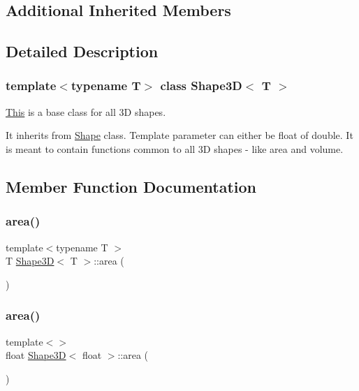\subsection*{Additional Inherited Members}


\subsection{Detailed Description}
\subsubsection*{template$<$typename T$>$\newline
class Shape3\+D$<$ T $>$}

\mbox{\hyperlink{classThis}{This}} is a base class for all 3D shapes. 

It inherits from \mbox{\hyperlink{classShape}{Shape}} class. Template parameter can either be float of double. It is meant to contain functions common to all 3D shapes -\/ like area and volume. 

\subsection{Member Function Documentation}
\mbox{\label{classShape3D_add8607daa60f43c6cb71e7162c107d71}} 
\subsubsection{\texorpdfstring{area()}{area()}\hspace{0.1cm}{\footnotesize\ttfamily [1/3]}}
{\footnotesize\ttfamily template$<$typename T $>$ \\
T \mbox{\hyperlink{classShape3D}{Shape3D}}$<$ T $>$\+::area (\begin{DoxyParamCaption}{ }\end{DoxyParamCaption})}

\mbox{\label{classShape3D_ae3c7c5cca570561caf09868885bea389}} 
\subsubsection{\texorpdfstring{area()}{area()}\hspace{0.1cm}{\footnotesize\ttfamily [2/3]}}
{\footnotesize\ttfamily template$<$$>$ \\
float \mbox{\hyperlink{classShape3D}{Shape3D}}$<$ float $>$\+::area (\begin{DoxyParamCaption}{ }\end{DoxyParamCaption})\hspace{0.3cm}{\ttfamily [inline]}}



